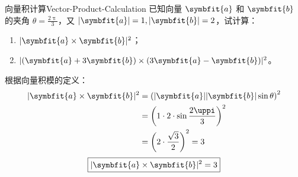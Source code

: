 \begin{problem}{向量积计算}{Vector-Product-Calculation}
    已知向量 $\symbfit{a}$ 和 $\symbfit{b}$ 的夹角 $\theta = \frac{2\uppi}{3}$，又 $|\symbfit{a}| = 1, |\symbfit{b}| = 2$，试计算：
    \begin{enumerate}
        \item $|\symbfit{a} \times \symbfit{b}|^2$；
        \item $|(\symbfit{a} + 3\symbfit{b}) \times (3\symbfit{a} - \symbfit{b})|^2$。
    \end{enumerate}
\end{problem}

\begin{solution}

    根据向量积模的定义：
    \begin{equation*}
        \begin{aligned}
            |\symbfit{a} \times \symbfit{b}|^2 & = \left( |\symbfit{a}| |\symbfit{b}| \sin \theta \right)^2 \\
                                               & = \left( 1 \cdot 2 \cdot \sin \frac{2\uppi}{3} \right)^2   \\
                                               & = \left( 2 \cdot \frac{\sqrt{3}}{2} \right)^2 = 3
        \end{aligned}
    \end{equation*}
    \begin{equation*}
        \boxed{|\symbfit{a} \times \symbfit{b}|^2 = 3}
    \end{equation*}



\end{solution}
